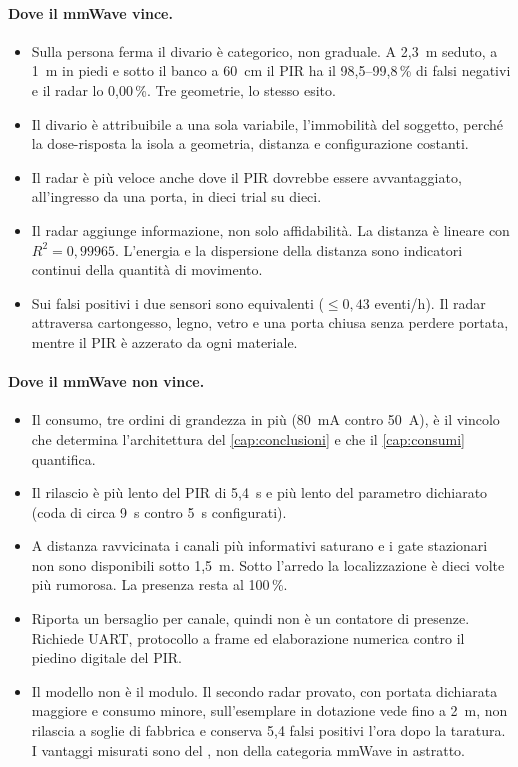 \paragraph{Dove il mmWave vince.}
\begin{itemize}[leftmargin=1.4em,itemsep=2pt]
  \item Sulla persona ferma il divario è categorico, non graduale. A 2,3~m seduto,
        a 1~m in piedi e sotto il banco a 60~cm il PIR ha il 98,5--99,8\,\% di falsi
        negativi e il radar lo 0,00\,\%. Tre geometrie, lo stesso esito.
  \item Il divario è attribuibile a una sola variabile, l'immobilità del soggetto,
        perché la dose-risposta la isola a geometria, distanza e configurazione
        costanti.
  \item Il radar è più veloce anche dove il PIR dovrebbe essere avvantaggiato,
        all'ingresso da una porta, in dieci trial su dieci.
  \item Il radar aggiunge informazione, non solo affidabilità. La distanza è lineare
        con $R^2 = 0{,}99965$. L'energia e la dispersione della distanza sono
        indicatori continui della quantità di movimento.
  \item Sui falsi positivi i due sensori sono equivalenti ($\leq 0{,}43$ eventi/h).
        Il radar attraversa cartongesso, legno, vetro e una porta chiusa senza perdere
        portata, mentre il PIR è azzerato da ogni materiale.
\end{itemize}

\paragraph{Dove il mmWave non vince.}
\begin{itemize}[leftmargin=1.4em,itemsep=2pt]
  \item Il consumo, tre ordini di grandezza in più (80~mA contro 50~\textmu A), è il
        vincolo che determina l'architettura del \cref{cap:conclusioni} e che il
        \cref{cap:consumi} quantifica.
  \item Il rilascio è più lento del PIR di 5,4~s e più lento del parametro
        dichiarato (coda di circa 9~s contro 5~s configurati).
  \item A distanza ravvicinata i canali più informativi saturano e i gate stazionari
        non sono disponibili sotto 1,5~m. Sotto l'arredo la localizzazione è dieci
        volte più rumorosa. La presenza resta al 100\,\%.
  \item Riporta un bersaglio per canale, quindi non è un contatore di presenze.
        Richiede UART, protocollo a frame ed elaborazione numerica contro il piedino
        digitale del PIR.
  \item Il modello non è il modulo. Il secondo radar provato, con portata dichiarata
        maggiore e consumo minore, sull'esemplare in dotazione vede fino a 2~m, non
        rilascia a soglie di fabbrica e conserva 5,4 falsi positivi l'ora dopo la
        taratura. I vantaggi misurati sono del \ldb, non della categoria mmWave in
        astratto.
\end{itemize}

